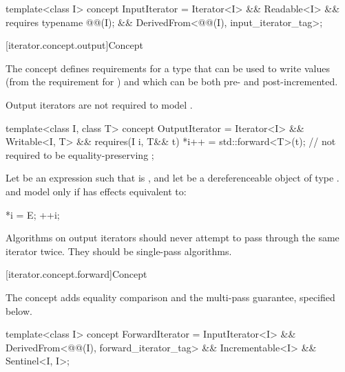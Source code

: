 %
\begin{codeblock}
template<class I>
  concept InputIterator =
    Iterator<I> &&
    Readable<I> &&
    requires { typename @@(I); } &&
    DerivedFrom<@@(I), input_iterator_tag>;
\end{codeblock}

[iterator.concept.output]{Concept }

\pnum
The  concept defines requirements for a type that
can be used to write values (from the requirement for
) and which can be both pre- and post-incremented.
\begin{note}
Output iterators are not required to model .
\end{note}

%
\begin{codeblock}
template<class I, class T>
  concept OutputIterator =
    Iterator<I> &&
    Writable<I, T> &&
    requires(I i, T&& t) {
      *i++ = std::forward<T>(t); // not required to be equality-preserving
    };
\end{codeblock}

\pnum
Let  be an expression such that  is , and let  be a
dereferenceable object of type .  and  model  only if
 has effects equivalent to:
\begin{codeblock}
  *i = E;
  ++i;
\end{codeblock}

\pnum
\begin{note}
Algorithms on output iterators should never attempt to pass through the same iterator twice.
They should be single-pass algorithms.
\end{note}

[iterator.concept.forward]{Concept }

\pnum
The  concept adds equality comparison and
the multi-pass guarantee, specified below.

%
\begin{codeblock}
template<class I>
  concept ForwardIterator =
    InputIterator<I> &&
    DerivedFrom<@@(I), forward_iterator_tag> &&
    Incrementable<I> &&
    Sentinel<I, I>;
\end{codeblock}

